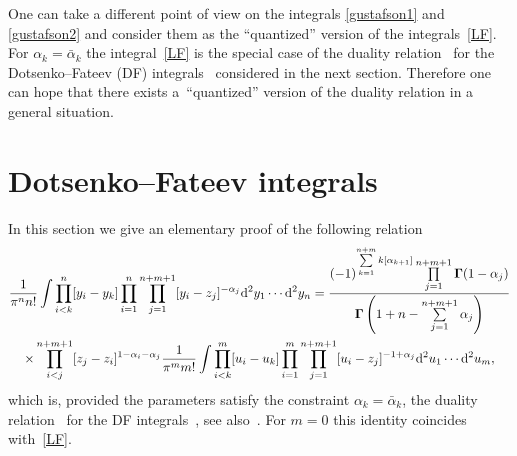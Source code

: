 \documentclass[pdftex]{sigma}
\numberwithin{equation}{section}
\begin{document}
One can take a different point of view on the integrals \eqref{gustafson1} and \eqref{gustafson2} and consider them as the ``quantized'' version of the integrals~\eqref{LF}. For $\alpha_k=\bar\alpha_k$ the integral~\eqref{LF} is the special case of the duality relation~\cite{Baseilhac:1998eq} for the Dotsenko--Fateev (DF) integrals~\cite{Dotsenko:1984ad} considered in the next section. Therefore one can hope that there exists a~``quantized'' version of the duality relation in a general situation.

\section{Dotsenko--Fateev integrals}\label{sect:FLI}

In this section we give an elementary proof of the following relation
\begin{gather}
\frac{1}{\pi^n n!}\int
\prod_{i<k}^{n} [y_i-y_k]
\prod_{i=1}^n \prod_{j=1}^{n+m+1} [y_i-z_j]^{-\alpha_j}
{\rm d}^2y_1\cdots {\rm d}^2y_n
 =
\frac{ (-1)^{\sum\limits_{k=1}^{n+m} k[\alpha_{k+1}]}
\prod\limits_{j=1}^{n+m+1} \boldsymbol\Gamma(1-\alpha_j)}{\boldsymbol\Gamma\left(1+n -\sum\limits_{j=1}^{n+m+1} \alpha_j\right)}\nonumber\\
\times\prod_{i<j}^{n+m+1} [z_j-z_i]^{1-\alpha_i-\alpha_j} \frac1{\pi^m m!}
\int\prod_{i<k}^{m} [u_i-u_k] \prod_{i=1}^m \prod_{j=1}^{n+m+1} [u_i-z_j]^{-1+\alpha_j} {\rm d}^2u_1\cdots {\rm d}^2u_m ,\label{duality}
\end{gather}
which is, provided the parameters satisfy the constraint $\alpha_k=\bar\alpha_k$, the duality
relation~\cite{Baseilhac:1998eq,Fateev:2007qn} for the DF integrals~\cite{Dotsenko:1984ad}, see
also~\cite{Pasquetti:2019tix}. For $m=0$ this identity coincides with~\eqref{LF}.
\end{document}
